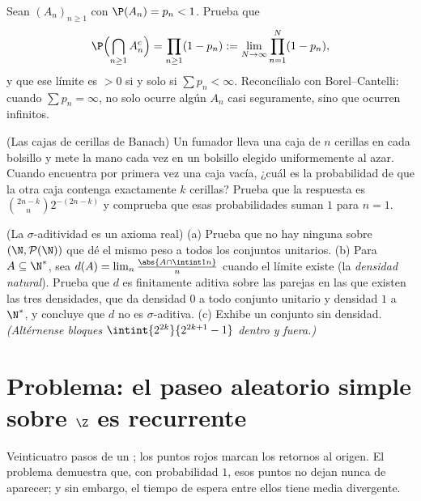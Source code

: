 \begin{exercise}[$\star\star$]\label{exo:b2:proba:10}
Sean $(A_n)_{n\geq1}$  con $\P(A_n) = p_n < 1$.
Prueba que
\[
\P\Bigl(\bigcap_{n\geq1}A_n^c\Bigr)
= \prod_{n\geq1}(1 - p_n)
:= \lim_{N\to\infty}\prod_{n=1}^N(1 - p_n),
\]
y que ese límite es $> 0$ si y solo si $\sum p_n < \infty$.
Reconcílialo con Borel--Cantelli: cuando $\sum p_n = \infty$, no solo
ocurre algún $A_n$ casi seguramente, sino que ocurren infinitos.
\end{exercise}

\begin{exercise}[$\star\star$]\label{exo:b2:proba:11}
(Las cajas de cerillas de Banach) Un fumador lleva una caja de $n$
cerillas en cada bolsillo y mete la mano cada vez en un bolsillo
elegido uniformemente al azar. Cuando encuentra por primera vez una
caja vacía, ¿cuál es la probabilidad de que la otra caja contenga
exactamente $k$ cerillas? Prueba que la respuesta es
$\binom{2n-k}{n}2^{-(2n-k)}$ y comprueba que esas probabilidades
suman $1$ para $n = 1$.
\end{exercise}

\begin{exercise}[$\star\star\star$]\label{exo:b2:proba:12}
(La $\sigma$-aditividad es un axioma real) (a) Prueba que no hay
ninguna  sobre $(\N, \mathcal P(\N))$ que dé el
mismo peso a todos los conjuntos unitarios. (b) Para $A \subseteq
\N^*$, sea $d(A) = \lim_n\frac{\abs{A\cap\intint1n}}{n}$ cuando el
límite existe (la \emph{densidad natural}). Prueba que $d$ es
finitamente aditiva sobre las parejas en las que existen las tres
densidades, que da densidad $0$ a todo conjunto unitario y densidad
$1$ a $\N^*$, y concluye que $d$ no es $\sigma$-aditiva. (c) Exhibe
un conjunto sin densidad. \emph{(Altérnense bloques
$\intint{2^{2k}}{2^{2k+1}-1}$ dentro y fuera.)}
\end{exercise}

\section{Problema: el paseo aleatorio simple sobre $\Z$ es recurrente}

\begin{omfigure}

{\small Veinticuatro pasos de un ; los puntos
rojos marcan los retornos al origen. El problema demuestra que, con
probabilidad $1$, esos puntos no dejan nunca de aparecer; y sin
embargo, el tiempo de espera entre ellos tiene media divergente.}
\end{omfigure}


